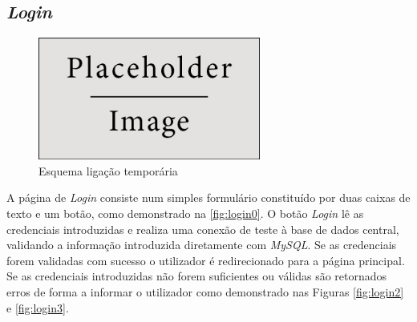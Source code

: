 \documentclass[11pt,twoside,a4paper]{report}
\begin{document}
\subsection{\textit{Login}}
\begin{figure}[H]
	\begin{center}
		\includegraphics[width=0.65\textwidth]{placeholder} %
		\caption{Esquema ligação temporária}
		\label{fig:login0}
	\end{center}
\end{figure}
A página de \textit{Login} consiste num simples formulário constituído por duas caixas de texto e um botão, como demonstrado na \autoref*{fig:login0}. O botão \textit{Login} lê as credenciais introduzidas e realiza uma conexão de teste à base de dados central, validando a informação introduzida diretamente com \textit{MySQL}. Se as credenciais forem validadas com sucesso o utilizador é redirecionado para a página principal. Se as credenciais introduzidas não forem suficientes ou válidas são retornados erros de forma a informar o utilizador como demonstrado nas Figuras \ref{fig:login2} e \ref{fig:login3}.
\end{document}
